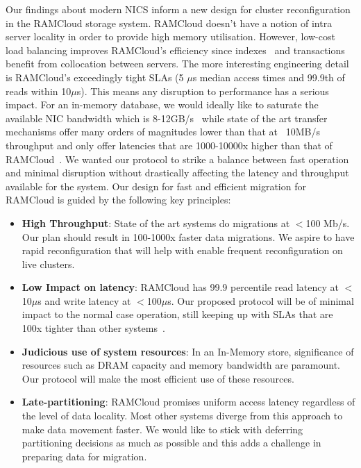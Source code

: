 Our findings about modern NICS inform a new design for cluster reconfiguration
in the RAMCloud storage system. RAMCloud doesn't have a notion of intra server locality 
in order to provide high memory utilisation. However, low-cost load balancing improves RAMCloud’s
efficiency since indexes~\cite{slik} and transactions~\cite{ramcloudtx} benefit from collocation between servers.
The more interesting engineering detail is RAMCloud’s exceedingly tight SLAs (5 $\mu$s median
access times and 99.9th of reads within 10$\mu$s). This means any disruption to performance
has a serious impact. For an in-memory database, we would ideally like to saturate the
available NIC bandwidth which is 8-12GB/s~\cite{cx3,cx4} while state of the art 
transfer mechanisms offer many orders of magnitudes lower than that at ~10MB/s 
throughput and only offer latencies that are 1000-10000x higher than that of RAMCloud~\cite{ramcloud}.
We wanted our protocol to strike a balance between fast operation and minimal disruption without drastically affecting
the latency and throughput available for the system. Our design for fast and efficient migration
for RAMCloud is guided by the following key principles:
\begin{itemize}
\item{\textbf{High Throughput}}: State of the art systems do migrations at $<$100 Mb/s. Our plan
should result in 100-1000x faster data migrations. We aspire to have rapid reconfiguration that will 
help with enable frequent reconfiguration on live clusters.
\item{\textbf{Low Impact on latency}}: RAMCloud has 99.9 percentile read latency at $<$10$\mu$s and write latency
at $<$100$\mu$s. Our proposed protocol will be of minimal impact to the normal case operation, still keeping
up with SLAs that are 100x tighter than other systems~\cite{squall}.
\item{\textbf{Judicious use of system resources}}: In an In-Memory store, significance of resources such as DRAM capacity and
memory bandwidth are paramount. Our protocol will make the most efficient use of these resources.
\item{\textbf{Late-partitioning}}: RAMCloud promises uniform access latency regardless of the level of data locality.
Most other systems diverge from this approach to make data movement faster. We would like to stick with
deferring partitioning decisions as much as possible and this adds a challenge in preparing data for migration.
\end{itemize}


